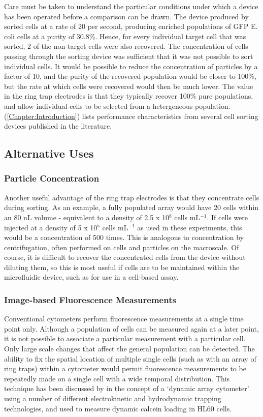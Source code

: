 Care must be taken to understand the particular conditions under which a device has been operated before a comparison can be drawn. The device produced by \cite{Fu:1999} sorted cells at a rate of 20 per second, producing enriched populations of GFP E. coli cells at a purity of 30.8\%. Hence, for every individual target cell that was sorted, 2 of the non-target cells were also recovered. The concentration of cells passing through the sorting device was sufficient that it was not possible to sort individual cells. It would be possible to reduce the concentration of particles by a factor of 10, and the purity of the recovered population would be closer to 100\%, but the rate at which cells were recovered would then be much lower. The value in the ring trap electrodes is that they typically recover 100\% pure populations, and allow individual cells to be selected from a hetergeneous population.  (\cref{Chapter:Introduction}) lists performance characteristics from several cell sorting devices published in the literature. 

\subsection{Alternative Uses}
\subsubsection{Particle Concentration}
Another useful advantage of the ring trap electrodes is that they concentrate cells during sorting. As an example, a fully populated array would have 20 cells within an 80 nL volume - equivalent to a density of 2.5 x 10$^{8}$ cells mL$^{-1}$. If cells were injected at a density of 5 x 10$^{5}$ cells mL$^{-1}$ as used in these experiments, this would be a concentration of 500 times. This is analogous to concentration by centrifugation, often performed on cells and particles on the macroscale. Of course, it is difficult to recover the concentrated cells from the device without diluting them, so this is most useful if cells are to be maintained within the microfluidic device, such as for use in a cell-based assay.

\subsubsection{Image-based Fluorescence Measurements}
Conventional cytometers perform fluorescence measurements at a single time point only. Although a population of cells can be measured again at a later point, it is not possible to associate a particular measurement with a particular cell. Only large scale changes that affect the general population can be detected. The ability to fix the spatial location of multiple single cells (such as with an array of ring traps) within a cytometer would permit fluorescence measurements to be repeatedly made on a single cell with a wide temporal distribution. This technique has been discussed by \cite{Voldman:2002,Kovac:2007} in the concept of a `dynamic array cytometer' using a number of different electrokinetic and hydrodynamic trapping technologies, and used to measure dynamic calcein loading in HL60 cells.

